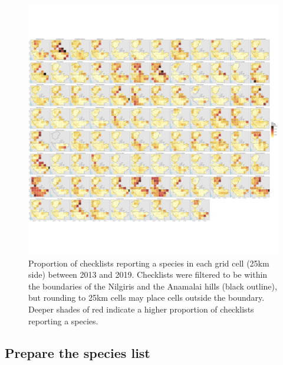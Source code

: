 \documentclass[]{article}
\newenvironment{Shaded}{\begin{snugshade}}{\end{snugshade}}
\newcommand{\CommentTok}[1]{\textcolor[rgb]{0.56,0.35,0.01}{\textit{#1}}}
\newcommand{\DataTypeTok}[1]{\textcolor[rgb]{0.13,0.29,0.53}{#1}}
\newcommand{\KeywordTok}[1]{\textcolor[rgb]{0.13,0.29,0.53}{\textbf{#1}}}
\newcommand{\NormalTok}[1]{#1}
\newcommand{\StringTok}[1]{\textcolor[rgb]{0.31,0.60,0.02}{#1}}
\begin{document}
\begin{figure}
\centering
\includegraphics{figs/fig_species_distributions.png}
\caption{Proportion of checklists reporting a species in each grid cell (25km side) between 2013 and 2019. Checklists were filtered to be within the boundaries of the Nilgiris and the Anamalai hills (black outline), but rounding to 25km cells may place cells outside the boundary. Deeper shades of red indicate a higher proportion of checklists reporting a species.}
\end{figure}

\hypertarget{prepare-the-species-list}{%
\subsection{Prepare the species list}\label{prepare-the-species-list}}

\begin{Shaded}
\end{Shaded}
\end{document}
